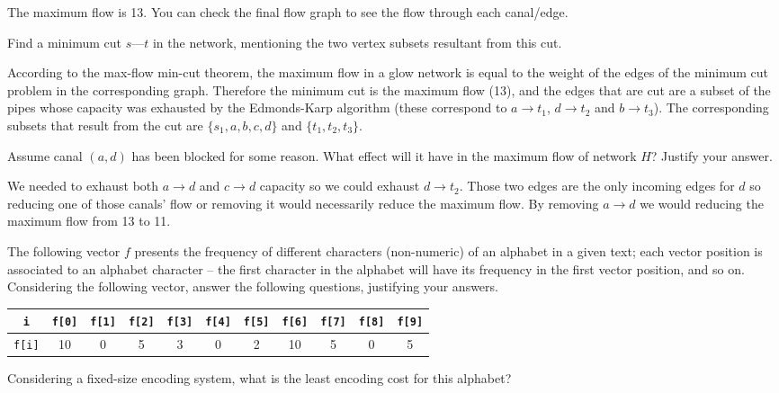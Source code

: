 \documentclass{cal}
\begin{document}
{The maximum flow is 13. You can check the final flow graph to see the flow through each canal/edge.

Find a minimum cut $s\text{---}t$ in the network, mentioning the two vertex subsets resultant from this cut.

\ansseparator

According to the max-flow min-cut theorem, the maximum flow in a glow network is equal to the weight of the edges of the minimum cut problem in the corresponding graph. Therefore the minimum cut is the maximum flow (13), and the edges that are cut are a subset of the pipes whose capacity was exhausted by the Edmonds-Karp algorithm (these correspond to $a \rightarrow t_1$, $d \rightarrow t_2$ and $b \rightarrow t_3$). The corresponding subsets that result from the cut are $\{s_1, a, b, c, d\}$ and $\{t_1, t_2, t_3\}$.

Assume canal $(a,d)$ has been blocked for some reason. What effect will it have in the maximum flow of network $H$? Justify your answer.

\ansseparator

We needed to exhaust both $a \rightarrow d$ and $c \rightarrow d$ capacity so we could exhaust $d \rightarrow t_2$. Those two edges are the only incoming edges for $d$ so reducing one of those canals' flow or removing it would necessarily reduce the maximum flow. By removing $a \rightarrow d$ we would reducing the maximum flow from 13 to 11.

The following vector $f$ presents the frequency of different characters (non-numeric) of an alphabet in a given text; each vector position is associated to an alphabet character -- the first character in the alphabet will have its frequency in the first vector position, and so on. Considering the following vector, answer the following questions, justifying your answers.

\begin{center}
    \begin{tabular}{c | c c c c c c c c c c}
        \texttt{i} & \texttt{f[0]} & \texttt{f[1]} & \texttt{f[2]} & \texttt{f[3]} & \texttt{f[4]} & \texttt{f[5]} & \texttt{f[6]} & \texttt{f[7]} & \texttt{f[8]} & \texttt{f[9]} \\ \hline
        \texttt{f[i]} & 10 & 0 & 5 & 3 & 0 & 2 & 10 & 5 & 0 & 5
    \end{tabular}
\end{center}

Considering a fixed-size encoding system, what is the least encoding cost for this alphabet?

}
\end{document}
